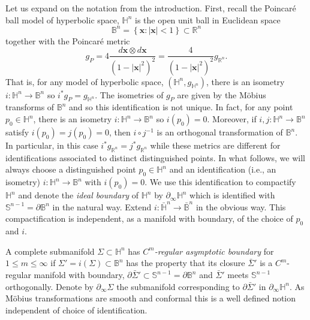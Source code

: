 \documentclass{amsart}
\theoremstyle{definition}
\theoremstyle{remark}
\numberwithin{equation}{section}
\newcommand{\set}[1]{\left\{#1\right\}}
\newcommand{\Real}{\mathbb R}
\begin{document}
Let us expand on the notation from the introduction.  First, recall the Poincar\'{e} ball model of hyperbolic space, $\mathbb{H}^n$ is the open unit ball in Euclidean space 
$$
\mathbb{B}^n=\set{\mathbf{x}:|\mathbf{x}|<1}\subset \Real^{n}
$$
together with the Poincar\'{e} metric
$$
g_P=4\frac{d\mathbf{x}\otimes d\mathbf{x}}{(1-|\mathbf{x}|^2)^2}=\frac{4}{(1-|\mathbf{x}|^2)^2} g_{\Real^n}.
$$
That is, for any model of hyperbolic space, $(\mathbb{H}^n,g_{\mathbb{H}^n})$, there is an isometry $i: \mathbb{H}^n\to \mathbb{B}^n$ so $i^* g_{P}=g_{\mathbb{H}^n}$. 
The isometries of $g_P$ are given by the M\"{o}bius transforms of $\mathbb{B}^n$ and so this identification is not unique.  In fact, for any point $p_0\in \mathbb{H}^n$, there is an isometry $i:  \mathbb{H}^n\to \mathbb{B}^n$ so $i(p_0)=0$.  Moreover, if $i, j:  \mathbb{H}^n\to \mathbb{B}^n$ satisfy $i(p_0)=j(p_0)=0$, then $i\circ j^{-1}$ is an orthogonal transformation of $\mathbb{B}^n$.  In particular, in this case $i^*g_{\Real^n}=j^*g_{\Real^n}$ while these metrics are different for identifications associated to distinct distinguished points.   In what follows, we will always choose a distinguished point $p_0\in \mathbb{H}^n$ and an identification (i.e., an isometry) $i: \mathbb{H}^n\to \mathbb{B}^n$ with $i(p_0)=0$. 
We use this identification to compactify $\mathbb{H}^n$ and denote the \emph{ideal boundary} of $\mathbb{H}^n$ by $\partial_\infty \mathbb{H}^n$ which is identified with $\mathbb{S}^{n-1}=\partial \mathbb{B}^n$ in the natural way. Extend $i:\bar{\mathbb{H}}^n\to \bar{\mathbb{B}}^n$ in the obvious way.  This compactification is independent, as a manifold with boundary, of the choice of $p_0$ and $i$.

A complete submanifold $\Sigma\subset \mathbb{H}^n$ has \emph{$C^m$-regular asymptotic boundary} for $1\leq m\leq\infty$ if $\Sigma'=i(\Sigma) \subset \mathbb{B}^n$ has the property that its closure $\bar{\Sigma}'$ is a $C^m$-regular manifold with boundary, $\partial \bar{\Sigma}'\subset \mathbb{S}^{n-1}=\partial \mathbb{B}^n$ and $\bar{\Sigma}'$ meets $\mathbb{S}^{n-1}$ orthogonally. Denote by $\partial_\infty \Sigma$ the submanifold corresponding to $\partial \bar{\Sigma}'$ in $\partial_\infty \mathbb{H}^n$.   As M\"{o}bius transformations are smooth and conformal this is a well defined notion independent of choice of identification.
\end{document}
